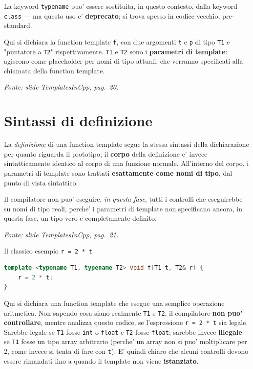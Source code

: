 \documentclass{report}
\newcommand{\code}[1]{\texttt{\small #1}}
\newcommand{\fonteslide}[1]{{\footnotesize\itshape\color{gray} Fonte: slide \emph{TemplatesInCpp}, pag.~#1.\par}}
\begin{document}
La keyword \code{typename} puo' essere sostituita, in questo contesto, dalla
keyword \code{class} --- ma questo uso e' \textbf{deprecato}; si trova spesso
in codice vecchio, pre-standard.

Qui si dichiara la function template \code{f}, con due argomenti \code{t} e
\code{p} di tipo \code{T1} e "puntatore a \code{T2}" rispettivamente.
\code{T1} e \code{T2} sono i \textbf{parametri di template}: agiscono come
placeholder per nomi di tipo attuali, che verranno specificati alla chiamata
della function template.

\fonteslide{20}

\section{Sintassi di definizione}

La \emph{definizione} di una function template segue la stessa sintassi
della dichiarazione per quanto riguarda il prototipo; il \textbf{corpo} della
definizione e' invece sintatticamente identico al corpo di una funzione
normale. All'interno del corpo, i parametri di template sono trattati
\textbf{esattamente come nomi di tipo}, dal punto di vista sintattico.

Il compilatore non puo' eseguire, \emph{in questa fase}, tutti i controlli
che eseguirebbe su nomi di tipo reali, perche' i parametri di template non
specificano ancora, in questa fase, un tipo vero e completamente definito.

\fonteslide{21}

\begin{Example}{Il classico esempio \code{r = 2 * t}}{}
\begin{lstlisting}[language=C++]
template <typename T1, typename T2> void f(T1 t, T2& r) {
    r = 2 * t;
}
\end{lstlisting}
Qui si dichiara una function template che esegue una semplice operazione
aritmetica. Non sapendo cosa siano realmente \code{T1} e \code{T2}, il
compilatore \textbf{non puo' controllare}, mentre analizza questo codice, se
l'espressione \code{r = 2 * t} sia legale. Sarebbe legale se \code{T1} fosse
\code{int} o \code{float} e \code{T2} fosse \code{float}; sarebbe invece
\textbf{illegale} se \code{T1} fosse un tipo array arbitrario (perche' un
array non si puo' moltiplicare per 2, come invece si tenta di fare con
\code{t}). E' quindi chiaro che alcuni controlli devono essere rimandati fino
a quando il template non viene \textbf{istanziato}.
\end{Example}
\end{document}
